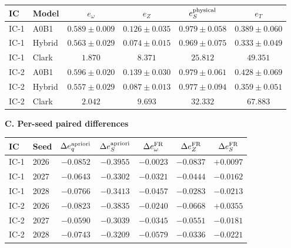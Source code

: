 \begin{table}[H]
\begin{tabular}{llcccc}\toprule
IC & Model & $e_\omega$ & $e_Z$ & $e_S^{\rm physical}$ & $e_T$\\\midrule
IC-1 & A0B1 & $0.589\pm0.009$ & $0.126\pm0.035$ & $0.979\pm0.058$ & $0.389\pm0.060$ \\
IC-1 & Hybrid & $0.563\pm0.029$ & $0.074\pm0.015$ & $0.969\pm0.075$ & $0.333\pm0.049$ \\
IC-1 & Clark & $1.870$ & $8.371$ & $25.812$ & $49.351$ \\
IC-2 & A0B1 & $0.596\pm0.020$ & $0.139\pm0.030$ & $0.979\pm0.061$ & $0.428\pm0.069$ \\
IC-2 & Hybrid & $0.557\pm0.029$ & $0.087\pm0.013$ & $0.977\pm0.094$ & $0.359\pm0.051$ \\
IC-2 & Clark & $2.042$ & $9.693$ & $32.332$ & $67.883$ \\
\bottomrule\end{tabular}\par\medskip
\textbf{C. Per-seed paired differences}\par\smallskip
\begin{tabular}{llccccc}\toprule
IC & Seed & $\Delta e_q^{\rm apriori}$ & $\Delta e_S^{\rm apriori}$ & $\Delta e_\omega^{\rm FR}$ & $\Delta e_Z^{\rm FR}$ & $\Delta e_S^{\rm FR}$\\\midrule
IC-1 & 2026 & $-0.0852$ & $-0.3955$ & $-0.0023$ & $-0.0837$ & $+0.0097$ \\
IC-1 & 2027 & $-0.0643$ & $-0.3302$ & $-0.0321$ & $-0.0444$ & $-0.0162$ \\
IC-1 & 2028 & $-0.0766$ & $-0.3413$ & $-0.0457$ & $-0.0283$ & $-0.0213$ \\
IC-2 & 2026 & $-0.0823$ & $-0.3835$ & $-0.0240$ & $-0.0668$ & $+0.0355$ \\
IC-2 & 2027 & $-0.0590$ & $-0.3039$ & $-0.0345$ & $-0.0551$ & $-0.0181$ \\
IC-2 & 2028 & $-0.0743$ & $-0.3209$ & $-0.0579$ & $-0.0336$ & $-0.0221$ \\
\bottomrule\end{tabular}
\end{table}
